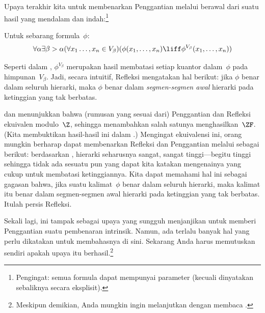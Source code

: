 \documentclass[../../../include/open-logic-section]{subfiles}
\begin{document}

Upaya terakhir kita untuk membenarkan Penggantian melalui \stagesinex
berawal dari suatu hasil yang mendalam dan indah:\footnote{Pengingat: semua
formula dapat mempunyai parameter (kecuali dinyatakan sebaliknya secara
eksplisit).}
\begin{thm}
Untuk sebarang formula~$\phi$:
\[
\forall \alpha \exists \beta > \alpha (\forall x_1 \ldots, x_n \in
V_\beta)(\phi(x_1, \ldots, x_n) \liff \phi^{V_\beta}(x_1, \ldots, x_n))
\]
\end{thm}
\noindent
Seperti dalam ,
$\phi^{V_\beta}$ merupakan hasil membatasi setiap kuantor dalam~$\phi$ pada
himpunan~$V_\beta$. Jadi, secara intuitif, Refleksi mengatakan hal berikut:
jika $\phi$ benar dalam seluruh hierarki, maka $\phi$ benar dalam
\emph{segmen-segmen awal} hierarki pada ketinggian yang tak berbatas.

\citet{Montague1961} dan \citet{Levy1960} menunjukkan bahwa (rumusan yang
sesuai dari) Penggantian dan Refleksi ekuivalen modulo~$\Z$, sehingga
menambahkan salah satunya menghasilkan~$\ZF$. (Kita membuktikan hasil-hasil
ini dalam .) Mengingat ekuivalensi
ini, orang mungkin berharap dapat membenarkan Refleksi dan Penggantian melalui
\stagesinex{} sebagai berikut: berdasarkan \stagesinex, hierarki seharusnya
sangat, sangat tinggi---begitu tinggi sehingga tidak ada sesuatu pun yang
dapat kita katakan mengenainya yang cukup untuk membatasi ketinggiannya. Kita
dapat memahami hal ini sebagai gagasan bahwa, jika suatu kalimat~$\phi$ benar
dalam seluruh hierarki, maka kalimat itu benar dalam segmen-segmen awal
hierarki pada ketinggian yang tak berbatas. Itulah persis Refleksi.

Sekali lagi, ini tampak sebagai upaya yang sungguh menjanjikan untuk memberi
Penggantian suatu pembenaran intrinsik. Namun, ada terlalu banyak hal yang
perlu dikatakan untuk membahasnya di sini. Sekarang Anda harus memutuskan
sendiri apakah upaya itu berhasil.\footnote{Meskipun demikian, Anda mungkin
ingin melanjutkan dengan membaca \citet[95--100]{Incurvati2020}.}
\end{document}
